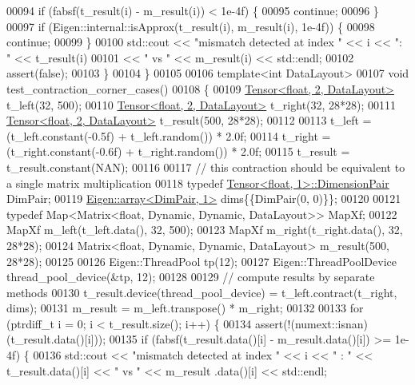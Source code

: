 \begin{DoxyCode}
00094     \textcolor{keywordflow}{if} (fabsf(t\_result(i) - m\_result(i)) < 1e-4f) \{
00095       \textcolor{keywordflow}{continue};
00096     \}
00097     \textcolor{keywordflow}{if} (Eigen::internal::isApprox(t\_result(i), m\_result(i), 1e-4f)) \{
00098       \textcolor{keywordflow}{continue};
00099     \}
00100     std::cout << \textcolor{stringliteral}{"mismatch detected at index "} << i << \textcolor{stringliteral}{": "} << t\_result(i)
00101               << \textcolor{stringliteral}{" vs "} <<  m\_result(i) << std::endl;
00102     assert(\textcolor{keyword}{false});
00103   \}
00104 \}
00105 
00106 \textcolor{keyword}{template}<\textcolor{keywordtype}{int} DataLayout>
00107 \textcolor{keywordtype}{void} test\_contraction\_corner\_cases()
00108 \{
00109   \hyperlink{class_eigen_1_1_tensor}{Tensor<float, 2, DataLayout>} t\_left(32, 500);
00110   \hyperlink{class_eigen_1_1_tensor}{Tensor<float, 2, DataLayout>} t\_right(32, 28*28);
00111   \hyperlink{class_eigen_1_1_tensor}{Tensor<float, 2, DataLayout>} t\_result(500, 28*28);
00112 
00113   t\_left = (t\_left.constant(-0.5f) + t\_left.random()) * 2.0f;
00114   t\_right = (t\_right.constant(-0.6f) + t\_right.random()) * 2.0f;
00115   t\_result = t\_result.constant(NAN);
00116 
00117   \textcolor{comment}{// this contraction should be equivalent to a single matrix multiplication}
00118   \textcolor{keyword}{typedef} \hyperlink{class_eigen_1_1_tensor}{Tensor<float, 1>::DimensionPair} DimPair;
00119   \hyperlink{class_eigen_1_1array}{Eigen::array<DimPair, 1>} dims\{\{DimPair(0, 0)\}\};
00120 
00121   \textcolor{keyword}{typedef} Map<Matrix<float, Dynamic, Dynamic, DataLayout>> MapXf;
00122   MapXf m\_left(t\_left.data(), 32, 500);
00123   MapXf m\_right(t\_right.data(), 32, 28*28);
00124   Matrix<float, Dynamic, Dynamic, DataLayout> m\_result(500, 28*28);
00125 
00126   Eigen::ThreadPool tp(12);
00127   Eigen::ThreadPoolDevice thread\_pool\_device(&tp, 12);
00128 
00129   \textcolor{comment}{// compute results by separate methods}
00130   t\_result.device(thread\_pool\_device) = t\_left.contract(t\_right, dims);
00131   m\_result = m\_left.transpose() * m\_right;
00132 
00133   \textcolor{keywordflow}{for} (ptrdiff\_t i = 0; i < t\_result.size(); i++) \{
00134     assert(!(numext::isnan)(t\_result.data()[i]));
00135     \textcolor{keywordflow}{if} (fabsf(t\_result.data()[i] - m\_result.data()[i]) >= 1e-4f) \{
00136       std::cout << \textcolor{stringliteral}{"mismatch detected at index "} << i << \textcolor{stringliteral}{" : "} << t\_result.data()[i] << \textcolor{stringliteral}{" vs "} <<  m\_result
      .data()[i] << std::endl;

\end{DoxyCode}
